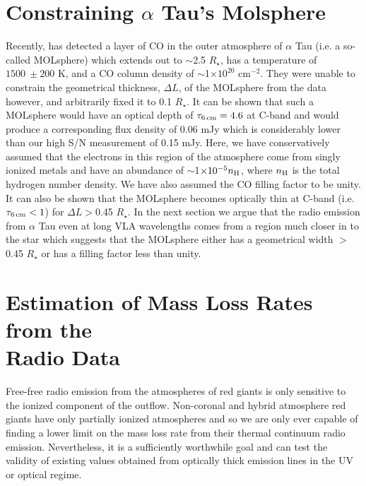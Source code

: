 \section{Constraining $\alpha$ Tau's Molsphere}\label{sec:6.5a}
Recently, \cite{ohnaka_2013} has detected a layer of CO in the outer atmosphere of $\alpha$ Tau (i.e. a so-called MOLsphere) which extends out to $\sim$2.5 $R_{\star}$, has a temperature of $1500 \ \pm 200$ K, and a CO column density of $\sim$1$\times 10^{20}$ cm$^{-2}$. They were unable to constrain the geometrical thickness, $\Delta L$, of the MOLsphere from the data however, and arbitrarily fixed it to 0.1 $R_{\star}$. It can be shown that such a MOLsphere would have an optical depth of $\tau _{\rm{6\,cm}} = 4.6$ at C-band and would produce a corresponding flux density of  0.06 mJy which is considerably lower than our high S/N measurement of 0.15 mJy. Here, we have conservatively assumed that the electrons in this region of the atmosphere come from singly ionized metals and have an abundance of $\sim$1$\times 10^{-5} n_{\rm{H}}$, where $n_{\rm{H}}$ is the total hydrogen number density. We have also assumed the CO filling factor to be unity. It can also be shown that the MOLsphere becomes optically thin at C-band (i.e. $\tau _{\rm{6\,cm}} < 1$) for $\Delta L >$0.45 $R_{\star}$. In the next section we argue that the radio emission from $\alpha$ Tau even at long VLA wavelengths comes from a region much closer in to the star which suggests that the MOLsphere either has a geometrical width  $>$0.45 $R _{\star}$ or has a filling factor less than unity.

\section{Estimation of Mass Loss Rates from the \\ Radio Data}\label{sec:6.5b}

Free-free radio emission from the atmospheres of red giants is only sensitive to the ionized component of the outflow. Non-coronal and hybrid atmosphere red giants have only partially ionized atmospheres and so we are only ever capable of finding a lower limit on the mass loss rate from their thermal continuum radio emission. Nevertheless, it is a sufficiently worthwhile goal and can test the validity of existing values obtained from optically thick emission lines in the UV or optical regime.

